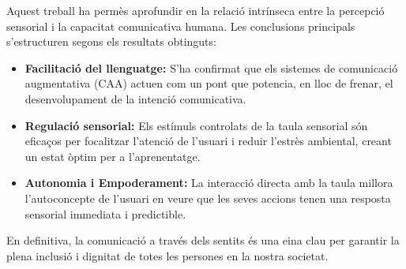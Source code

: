Aquest treball ha permès aprofundir en la relació intrínseca entre la percepció sensorial i la capacitat comunicativa humana. Les conclusions principals s'estructuren segons els resultats obtinguts:

\begin{itemize}
    \item \textbf{Facilitació del llenguatge:} S'ha confirmat que els sistemes de comunicació augmentativa (CAA) actuen com un pont que potencia, en lloc de frenar, el desenvolupament de la intenció comunicativa.
    \item \textbf{Regulació sensorial:} Els estímuls controlats de la taula sensorial són eficaços per focalitzar l'atenció de l'usuari i reduir l'estrès ambiental, creant un estat òptim per a l'aprenentatge.
    \item \textbf{Autonomia i Empoderament:} La interacció directa amb la taula millora l'autoconcepte de l'usuari en veure que les seves accions tenen una resposta sensorial immediata i predictible.
\end{itemize}

En definitiva, la comunicació a través dels sentits és una eina clau per garantir la plena inclusió i dignitat de totes les persones en la nostra societat.
